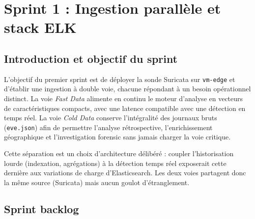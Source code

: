 \section{Sprint 1 : Ingestion parallèle et stack ELK}
\label{sec:sprint1}

\subsection{Introduction et objectif du sprint}

L'objectif du premier sprint est de déployer la sonde Suricata sur \texttt{vm-edge} et d'établir une ingestion à double voie, chacune répondant à un besoin opérationnel distinct. La voie \emph{Fast Data} alimente en continu le moteur d'analyse en vecteurs de caractéristiques compacts, avec une latence compatible avec une détection en temps réel. La voie \emph{Cold Data} conserve l'intégralité des journaux bruts (\texttt{eve.json}) afin de permettre l'analyse rétrospective, l'enrichissement géographique et l'investigation forensic sans jamais charger la voie critique.

Cette séparation est un choix d'architecture délibéré : coupler l'historisation lourde (indexation, agrégations) à la détection temps réel exposerait cette dernière aux variations de charge d'Elasticsearch. Les deux voies partagent donc la même source (Suricata) mais aucun goulot d'étranglement.

\subsection{Sprint backlog}

